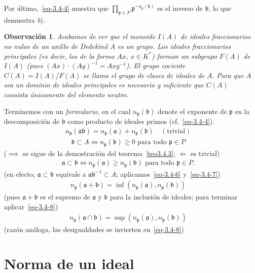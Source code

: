 \documentclass[bibtotoc,leqno,spanish]{amsbook}
\newcommand{\idl}[1]{\mathfrak{#1}}
\numberwithin{equation}{section}
\theoremstyle{note}
\theoremstyle{note}
\theoremstyle{rem}
\newtheorem*{remark*}{Observaci\'on}
\numberwithin{theorem}{section}
\numberwithin{proposition}{section}
\numberwithin{definition}{section}
\numberwithin{lemma}{section}
\numberwithin{corollary}{section}
\numberwithin{example}{section}
\numberwithin{footnote}{section}%
\begin{document}
Por \'ultimo,~\eqref{eq-3.4-4} muestra que $\prod_{\idl{p}\in P}\idl{p}^{-n_{\idl{p}}(\idl{b})}$ es el inverso
de $\idl{b}$, lo que demuestra {\itshape b}).

\begin{remark*}
Acabamos de ver que el monoide $I(A)$ de ideales fraccionarios no nulos de un anillo de Dedekind $A$
es un grupo. Los ideales fraccionarios {\em principales} (es decir, los de la forma $Ax$, $x\in K^{*}$)
forman un subgrupo $F(A)$ de $I(A)$ (pues $(Ax)\cdot(Ay)^{-1} = Axy^{-1}$). El grupo cociente
$C(A) = I(A)/F(A)$ se llama el {\em grupo de clases de ideales} de $A$. Para que $A$ sea un dominio
de ideales principales es necesario y suficiente que $C(A)$ consista \'unicamente del elemento neutro.
\end{remark*}

Terminemos con un {\em formulario,} en el cual $n_{\idl{p}}(\idl{b})$ denote el exponente de $\idl{p}$
en la descomposici\'on de $\idl{b}$ como producto de ideales primos (cf.~\eqref{eq-3.4-4}).
\begin{gather}\label{eq-3.4-6}
n_{\idl{p}}(\idl{a}\idl{b}) = n_{\idl{p}}(\idl{a})+n_{\idl{p}}(\idl{b})\quad(\text{trivial})
\end{gather}
\begin{gather}\label{eq-3.4-7}
\idl{b}\subset A\iff n_{\idl{p}}(\idl{b})\geq 0\text{ para todo }\idl{p}\in P
\end{gather}
($\implies$ se sigue de la demostraci\'on del teorema~\ref{teo3.4.3}; $\Leftarrow$ es trivial)
\begin{gather}\label{eq-3.4-8}
\idl{a}\subset\idl{b}\iff n_{\idl{p}}(\idl{a})\geq n_{\idl{p}}(\idl{b})\text{ para todo }\idl{p}\in P.
\end{gather}
(en efecto, $\idl{a}\subset\idl{b}$ equivale a $\idl{a}\idl{b}^{-1}\subset A$; aplicamos~\eqref{eq-3.4-6} y~\eqref{eq-3.4-7})
\begin{gather}
n_{\idl{p}}(\idl{a}+\idl{b}) = \inf(n_{\idl{p}}(\idl{a}),n_{\idl{p}}(\idl{b}))
\end{gather}
(pues $\idl{a}+\idl{b}$ es el supremo de $\idl{a}$ y $\idl{b}$ para la inclusi\'on de ideales; para
terminar aplicar~\eqref{eq-3.4-8})
\begin{gather}
n_{\idl{p}}(\idl{a}\cap\idl{b}) = \sup(n_{\idl{p}}(\idl{a}),n_{\idl{p}}(\idl{b}))
\end{gather}
(raz\'on an\'aloga, las desigualdades se invierten en~\eqref{eq-3.4-8})

\section{Norma de un ideal}\label{sec3.5}
\end{document}
